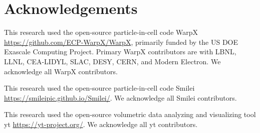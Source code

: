 
\chapter{Acknowledgements}

This research used the open-source particle-in-cell code WarpX \url{https://github.com/ECP-WarpX/WarpX}, primarily funded by the US DOE Exascale Computing Project. Primary WarpX contributors are with LBNL, LLNL, CEA-LIDYL, SLAC, DESY, CERN, and Modern Electron. We acknowledge all WarpX contributors.

This research used the open-source particle-in-cell code Smilei \url{https://smileipic.github.io/Smilei/}. We acknowledge all Smilei contributors.

This research used the open-source volumetric data analyzing and visualizing tool yt \url{https://yt-project.org/}. We acknowledge all yt contributors.
    
    


